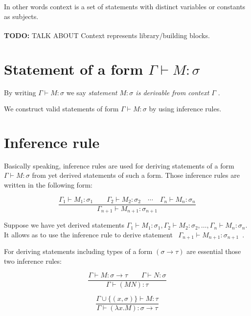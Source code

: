 \documentclass[12pt,a4paper]{report}
\newcommand{\turst}[3]{$#1 \vdash #2 : #3$\xspace}
\newcommand{\GMS}{\turst{\Gamma}{M}{\sigma}}
\begin{document}
	In other words context is a set of statements with distinct variables or constants as subjects.
	\\\\
	\textbf{TODO:} TALK ABOUT Context represents library/building blocks.
	
	
	
\section{Statement of a form \GMS}

	By writing \GMS we say 
	{\it statement $M : \sigma$ is derivable from context $\Gamma$ }.

	We construct valid statements of form \GMS by using inference rules.
	
		
\section{Inference rule}		
	
	Basically speaking, inference rules are used for deriving statements of a form 
	\GMS from yet derived statements of such a form.
	Those inference rules are written in the following form:
	
	\begin{equation*}
		\frac{\Gamma_1 \vdash M_1 : \sigma_1 \qquad
			  \Gamma_2 \vdash M_2 : \sigma_2 \quad
			  \dotsm \quad
		      \Gamma_n \vdash M_n : \sigma_n}
		     {\Gamma_{n+1} \vdash M_{n+1} : \sigma_{n+1}}
	\end{equation*}	
	
	Suppose we have yet derived statements 
	$\Gamma_1 \vdash M_1 : \sigma_1 ,
	 \Gamma_2 \vdash M_2 : \sigma_2 ,
	 \dots ,
	 \Gamma_n \vdash M_n : \sigma_n$. 
	It allows as to use the inference rule to derive statement
	\mbox{ $\Gamma_{n+1} \vdash M_{n+1} : \sigma_{n+1}$ }.
	 
	For deriving statements including types of a form 
	$(\sigma \rightarrow \tau)$ are essential those two 
	inference rules:
	
	\begin{equation*}
		\frac{\Gamma \vdash M : \sigma \rightarrow \tau \qquad
			  \Gamma \vdash N : \sigma }
		     {\Gamma \vdash (M N) : \tau }
	\end{equation*}	
	
	\begin{equation*}
		\frac{\Gamma \cup \{ ( x,\sigma ) \} \vdash M : \tau }
		     {\Gamma \vdash (\lambda x . M) : \sigma \rightarrow \tau }
	\end{equation*}		 
	 
\end{document}
